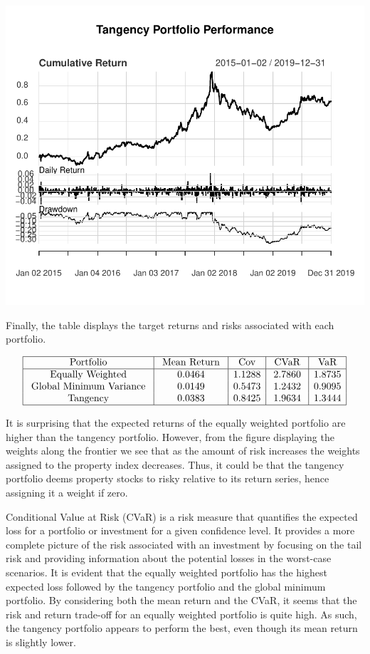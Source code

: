 \documentclass[11pt,preprint, authoryear]{elsarticle}
\numberwithin{equation}{section}
\numberwithin{figure}{section}
\numberwithin{table}{section}
\begin{document}
\includegraphics{FinMetrics-Essay_files/figure-latex/unnamed-chunk-29-1.pdf}

Finally, the table displays the target returns and risks associated with
each portfolio.

\[
\begin{array}{|c|c|c|c|c|}
\hline \text { Portfolio } & \text { Mean Return } & \text { Cov } & \text { CVaR } & \text { VaR }  \\
\hline \text { Equally Weighted } & { 0.0464 } & {1.1288 } & {2.7860 } & {1.8735 }\\
\text { Global Minimum Variance } & {0.0149 } & {0.5473 } & {1.2432} & {0.9095 } \\
\text { Tangency } & {0.0383 } & {0.8425 } & {1.9634 } & {1.3444 } \\
\hline
\end{array}
\]

It is surprising that the expected returns of the equally weighted
portfolio are higher than the tangency portfolio. However, from the
figure displaying the weights along the frontier we see that as the
amount of risk increases the weights assigned to the property index
decreases. Thus, it could be that the tangency portfolio deems property
stocks to risky relative to its return series, hence assigning it a
weight if zero.

Conditional Value at Risk (CVaR) is a risk measure that quantifies the
expected loss for a portfolio or investment for a given confidence
level. It provides a more complete picture of the risk associated with
an investment by focusing on the tail risk and providing information
about the potential losses in the worst-case scenarios. It is evident
that the equally weighted portfolio has the highest expected loss
followed by the tangency portfolio and the global minimum portfolio. By
considering both the mean return and the CVaR, it seems that the risk
and return trade-off for an equally weighted portfolio is quite high. As
such, the tangency portfolio appears to perform the best, even though
its mean return is slightly lower.
\end{document}
